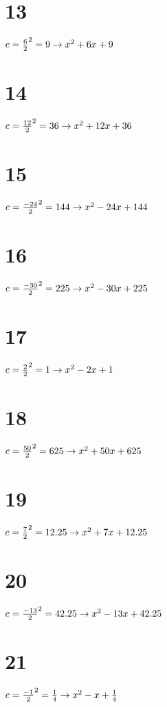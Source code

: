 \documentclass{article}
\theoremstyle{definition}
\begin{document}
\section*{13}
$c=\frac{6}{2}^2=9\newline\rightarrow x^2+6x+9$

\section*{14}
$c=\frac{12}{2}^2=36\newline\rightarrow x^2+12x+36$

\section*{15}
$c=\frac{-24}{2}^2=144\newline\rightarrow x^2-24x+144$

\section*{16}
$c=\frac{-30}{2}^2=225\newline\rightarrow x^2-30x+225$

\section*{17}
$c=\frac{2}{2}^2=1\newline\rightarrow x^2-2x+1$

\section*{18}
$c=\frac{50}{2}^2=625\newline\rightarrow x^2+50x+625$

\section*{19}
$c=\frac{7}{2}^2=12.25\newline\rightarrow x^2+7x+12.25$

\section*{20}
$c=\frac{-13}{2}^2=42.25\newline\rightarrow x^2-13x+42.25$

\section*{21}
$c=\frac{-1}{2}^2=\frac{1}{4}\newline\rightarrow x^2-x+\frac{1}{4}$
\end{document}
